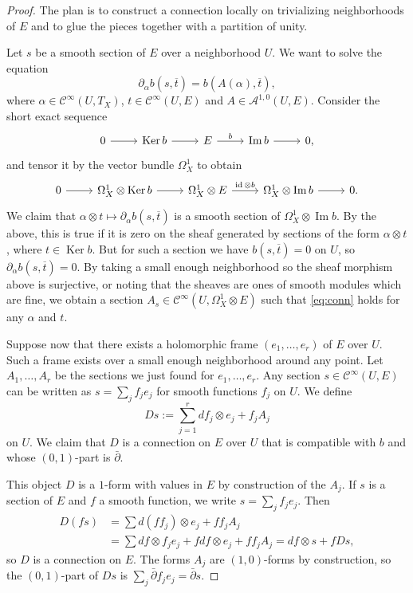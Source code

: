 \documentclass[10pt,a4paper]{article}
\newtheorem*{proof}{Proof}
\newcommand{\cc}[1]{\mathcal{#1}}
\def\ov#1{\overline{#1}}
\DeclareMathOperator{\im}{Im}
\DeclareMathOperator{\Ker}{Ker}
\DeclareMathOperator{\id}{id}
\begin{document}
\begin{proof}
The plan is to construct a connection locally on trivializing neighborhoods of $E$ and to glue the pieces together with a partition of unity.

Let $s$ be a smooth section of $E$ over a neighborhood $U$. We want to solve the equation
\begin{equation}
\label{eq:conn}
\partial_\alpha b(s, \ov t)
= b(A(\alpha), \ov t),
\end{equation}
where $\alpha \in \cc C^\infty(U, T_X)$, $t \in \cc C^\infty(U, E)$ and $A \in \cc A^{1,0}(U, E)$. Consider the short exact sequence
\[
\begin{tikzcd}
0 \ar[r] &
\Ker b \ar[r] &
E \ar[r,"b"] &
\im b \ar[r] &
0,
\end{tikzcd}
\]
and tensor it by the vector bundle $\Omega^1_X$ to obtain
\[
\begin{tikzcd}
0 \ar[r] &
\Omega^1_X \otimes \Ker b \ar[r] &
\Omega^1_X \otimes E \ar[r,"\id \otimes b"] &
\Omega^1_X \otimes \im b \ar[r] &
0.
\end{tikzcd}
\]
We claim that $\alpha \otimes t \mapsto \partial_\alpha b(s, \ov t)$ is a smooth section of $\Omega^1_X \otimes \im b$. By the above, this is true if it is zero on the sheaf generated by sections of the form $\alpha \otimes t$, where $t \in \Ker b$. But for such a section we have $b(s, \ov t) = 0$ on $U$, so $\partial_\alpha b(s, \ov t) = 0$. By taking a small enough neighborhood so the sheaf morphism above is surjective, or noting that the sheaves are ones of smooth modules which are fine, we obtain a section $A_s \in \cc C^\infty(U, \Omega_X^1 \otimes E)$ such that \eqref{eq:conn} holds for any $\alpha$ and $t$.

Suppose now that there exists a holomorphic frame $(e_1, \ldots, e_r)$ of $E$ over $U$. Such a frame exists over a small enough neighborhood around any point. Let $A_1, \ldots, A_r$ be the sections we just found for $e_1, \ldots, e_r$. Any section $s \in \cc C^\infty(U, E)$ can be written as $s = \sum_j f_j e_j$ for smooth functions $f_j$ on $U$. We define
\[
D s := \sum_{j=1}^r df_j \otimes e_j + f_j A_j
\]
on $U$. We claim that $D$ is a connection on $E$ over $U$ that is compatible with $b$ and whose $(0,1)$-part is $\bar\partial$.

This object $D$ is a $1$-form with values in $E$ by construction of the $A_j$. If $s$ is a section of $E$ and $f$ a smooth function, we write $s = \sum_j f_j e_j$. Then
\begin{align*}
D(fs)
&= \sum d(f f_j) \otimes e_j + f f_j A_j
\\
&= \sum df \otimes f_j e_j + f df \otimes e_j + f f_j A_j
= df \otimes s + f Ds,
\end{align*}
so $D$ is a connection on $E$. The forms $A_j$ are $(1,0)$-forms by construction, so the $(0,1)$-part of $Ds$ is $\sum_j \bar\partial f_j e_j = \bar\partial s$.


\end{proof}
\end{document}
